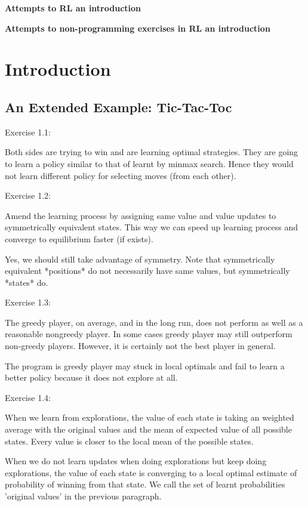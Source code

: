 \documentclass[11pt,a4paper]{report}
\begin{document}
\clearpage
\thispagestyle{empty}
\begin{center}\LARGE\bf
	Attempts to RL an introduction
\end{center}
\newpage
\setcounter{page}{1}
\begin{center}\Large\bf
	Attempts to non-programming exercises in RL an introduction
\end{center}

\chapter{Introduction}
\section{An Extended Example: Tic-Tac-Toc}%
\label{sec:An Extended Example: Tic-Tac-Toc}
Exercise 1.1:

Both sides are trying to win and are learning optimal strategies. They are going to learn a policy similar to that of learnt by minmax search. Hence they would not learn different policy for selecting moves (from each other).

Exercise 1.2:

Amend the learning process by assigning same value and value updates to symmetrically equivalent states. This way we can speed up learning process and converge to equilibrium faster (if exists). 

Yes, we should still take advantage of symmetry. Note that symmetrically equivalent *positions* do not necessarily have same values, but symmetrically *states* do.

Exercise 1.3:

The greedy player, on average, and in the long run, does not perform as well as a reasonable nongreedy player. In some cases greedy player may still outperform non-greedy players. However, it is certainly not the best player in general.

The program is greedy player may stuck in local optimals and fail to learn a better policy because it does not explore at all.

Exercise 1.4:

When we learn from explorations, the value of each state is taking an weighted average with the original values and the mean of expected value of all possible states. Every value is closer to the local mean of the possible states. 

When we do not learn updates when doing explorations but keep doing explorations, the value of each state is converging to a local optimal estimate of probability of winning from that state. We call the set of learnt probabilities 'original values' in the previous paragraph.
\end{document}
